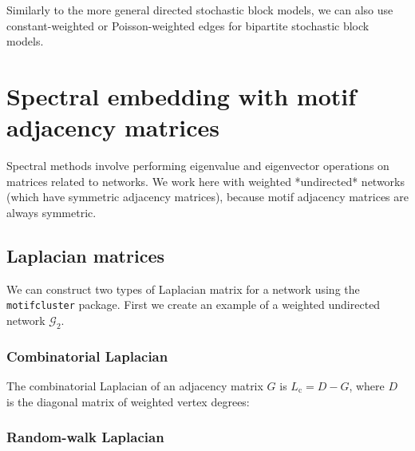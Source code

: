 \documentclass{article}
\begin{document}
Similarly to the more general directed stochastic block models,
we can also use constant-weighted or Poisson-weighted edges for bipartite
stochastic block models.

\begin{pyconsole}
\end{pyconsole}




\section{Spectral embedding with motif adjacency matrices}

Spectral methods involve performing eigenvalue and
eigenvector operations on matrices related to networks.
We work here with weighted *undirected* networks
(which have symmetric adjacency matrices),
because motif adjacency matrices are always symmetric.

\subsection{Laplacian matrices}

We can construct two types of Laplacian matrix for a network
using the \texttt{motifcluster} package.
First we create an example of a weighted undirected network $\mathcal{G}_2$.

\begin{pyconsole}
\end{pyconsole}

\subsubsection{Combinatorial Laplacian}

The combinatorial Laplacian of an adjacency matrix $G$ is
$L_\mathrm{c} = D - G$,
where $D$ is the diagonal matrix of weighted vertex degrees:

\begin{pyconsole}
\end{pyconsole}

\subsubsection{Random-walk Laplacian}
\end{document}
